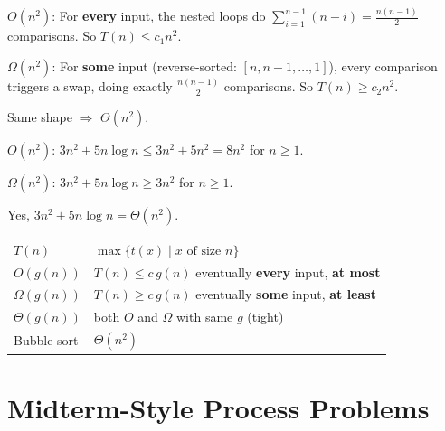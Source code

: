 \documentclass[11pt]{article}
\newcommand{\every}{\textcolor{greenO}{\textbf{every}}}
\newcommand{\atmost}{\textcolor{greenO}{\textbf{at most}}}
\newcommand{\some}{\textcolor{rustW}{\textbf{some}}}
\newcommand{\atleast}{\textcolor{rustW}{\textbf{at least}}}
\begin{document}
\begin{keybox}[Bubble Sort: $T(n) = \Theta(n^2)$]
\textcolor{greenO}{$O(n^2)$:} For \every{} input, the nested loops do $\sum_{i=1}^{n-1}(n-i) = \frac{n(n-1)}{2}$ comparisons. So $T(n) \le c_1 n^2$.

\textcolor{rustW}{$\Omega(n^2)$:} For \some{} input (reverse-sorted: $[n, n{-}1, \ldots, 1]$), every comparison triggers a swap, doing exactly $\frac{n(n-1)}{2}$ comparisons. So $T(n) \ge c_2 n^2$.

Same shape $\Rightarrow$ $\Theta(n^2)$.
\end{keybox}

\begin{examplebox}
\textcolor{greenO}{$O(n^2)$:} $3n^2 + 5n\log n \le 3n^2 + 5n^2 = 8n^2$ for $n \ge 1$. \checkmark

\textcolor{rustW}{$\Omega(n^2)$:} $3n^2 + 5n\log n \ge 3n^2$ for $n \ge 1$. \checkmark

Yes, $3n^2 + 5n\log n = \Theta(n^2)$.
\end{examplebox}

\begin{keybox}
\renewcommand{\arraystretch}{1.35}
\begin{tabular}{l l}
$T(n)$ & $\max\{t(x) \mid x \text{ of size } n\}$ \\
\textcolor{greenO}{$O(g(n))$} & $T(n) \le c\,g(n)$ eventually \quad \every{} input, \atmost \\
\textcolor{rustW}{$\Omega(g(n))$} & $T(n) \ge c\,g(n)$ eventually \quad \some{} input, \atleast \\
\textcolor{violetT}{$\Theta(g(n))$} & both $O$ and $\Omega$ with same $g$ (tight) \\
Bubble sort & $\Theta(n^2)$ \\
\end{tabular}
\end{keybox}

\newpage


\section{Midterm-Style Process Problems}
\end{document}
